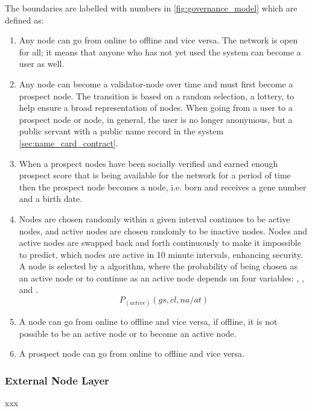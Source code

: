 The boundaries are labelled with numbers in \cref{fig:governance_model} which are defined as:
\begin{enumerate}
 \item Any node can go from online to offline and vice versa. The network is open for all; it means that anyone who has not yet used the system can become a user as well. 
 
 \item Any node can become a validator-node over time and must first become a prospect node. The transition is based on a random selection, a lottery, to help ensure a broad representation of nodes. When going from a user to a prospect node or node, in general, the user is no longer anonymous, but a public servant with a public name record in the system \cref{sec:name_card_contract}.
 
 \item When a prospect nodes have been socially verified and earned enough prospect score that is being available for the network for a period of time then the prospect node becomes a node, i.e. born and receives a gene number and a birth date.
 
 \item Nodes are chosen randomly within a given interval continues to be active nodes, and active nodes are chosen randomly to be inactive nodes. Nodes and active nodes are swapped back and forth continuously to make it impossible to predict, which nodes are active in 10 minute intervals, enhancing security. A node is selected by a  algorithm, where the probability of being chosen as an active node or to continue as an active node depends on four variables:  ,  ,   and . 
 \begin{equation}
  P_{(active)} (gs, cl, na/at)
 \end{equation}
 
 \item A node can go from online to offline and vice versa, if offline, it is not possible to be an active node or to become an active node. 
 
 \item A prospect node can go from online to offline and vice versa. 
\end{enumerate}

\subsubsection{External Node Layer} \label{sec:extenal_node_layer}
xxx

